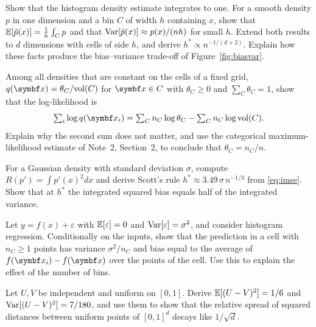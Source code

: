 \documentclass[11pt]{article}
\begin{document}
\begin{questions}
\begin{derivations}
\item Show that the histogram density estimate integrates to one. For a smooth density $p$ in one dimension and a bin
$C$ of width $h$ containing $x$, show that $\mathbb{E}[\hat p(x)] = \frac{1}{h}\int_C p$ and that $\operatorname{Var}[\hat p(x)] \approx
p(x)/(nh)$ for small $h$. Extend both results to $d$ dimensions with cells of side $h$, and derive
$h^* \propto n^{-1/(d+2)}$. Explain how these facts produce the bias--variance trade-off of
Figure~\ref{fig:biasvar}.
\item Among all densities that are constant on the cells of a fixed grid, $q(\x) = \theta_C/\mathrm{vol}(C)$ for
$\x \in C$ with $\theta_C \ge 0$ and $\sum_C \theta_C = 1$, show that the log-likelihood is
\[
  \textstyle\sum_i \log q(\x_i) = \sum_C n_C \log \theta_C - \sum_C n_C \log \mathrm{vol}(C) .
\]
Explain why the second sum does not matter, and use the categorical maximum-likelihood estimate of Note~2, Section~2, to conclude that
$\theta_C = n_C/n$.
\item For a Gaussian density with standard deviation $\sigma$, compute $R(p') = \int p'(x)^2 dx$ and derive Scott's
rule $h^* \approx 3.49\, \sigma\, n^{-1/3}$ from \eqref{eq:imse}. Show that at $h^*$ the integrated squared bias equals
half of the integrated variance.
\item Let $y = f(x) + \varepsilon$ with $\mathbb{E}[\varepsilon] = 0$ and $\operatorname{Var}[\varepsilon] = \sigma^2$, and consider
histogram regression. Conditionally on the inputs, show that the prediction in a cell with $n_C \ge 1$ points has
variance $\sigma^2/n_C$ and bias equal to the average of $f(\x_i) - f(\x)$ over the points of the cell. Use this to
explain the effect of the number of bins.
\item Let $U, V$ be independent and uniform on $[0, 1]$. Derive $\mathbb{E}[(U - V)^2] = 1/6$ and $\operatorname{Var}[(U - V)^2] = 7/180$,
and use them to show that the relative spread of squared distances between uniform points of $[0, 1]^d$ decays like
$1/\sqrt d$.
\end{derivations}


\end{questions}
\end{document}
